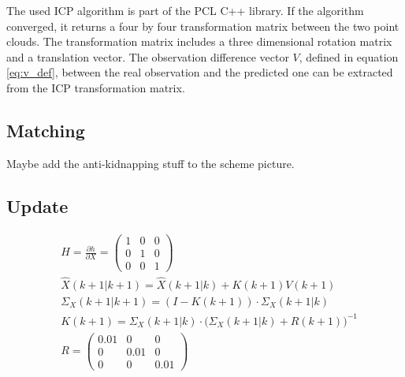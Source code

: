 The used ICP algorithm is part of the PCL C++ library. If the algorithm converged, it returns a four by four transformation matrix between the two point clouds. The transformation matrix includes a three dimensional rotation matrix and a translation vector. The observation difference vector $V$, defined in equation \eqref{eq:v_def}, between the real observation and the predicted one can be extracted from the ICP transformation matrix. 

\subsection{Matching}
\label{subsec:Matching}


Maybe add the anti-kidnapping stuff to the scheme picture.

\subsection{Update}
\label{subsec:Update}


\begin{align}
& H = \frac{\partial h}{\partial X} =\begin{pmatrix} 1 & 0 & 0 \\ 0 & 1 & 0 \\ 0 & 0 & 1\end{pmatrix} \\
& \hat{X}(k+1|k+1) = \hat{X}(k+1|k) + K(k+1)V(k+1) \label{eq:state_update_def} \\
& \Sigma_{X}(k+1|k+1) = (I-K(k+1))\cdot\Sigma_{X}(k+1|k) \label{eq:cov_update_def} \\
& K(k+1)= \Sigma_{X}(k+1|k)\cdot {(\Sigma_{X}(k+1|k) + R(k+1)})^{-1} \\
& R= \begin{pmatrix} 0.01 & 0 & 0 \\ 0 & 0.01 & 0 \\ 0 & 0 & 0.01\end{pmatrix}
\end{align}

